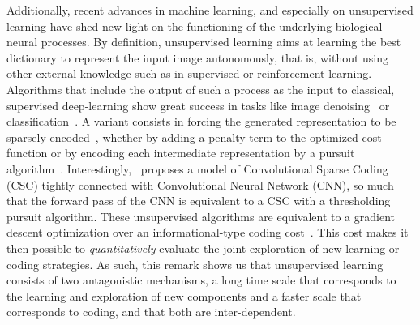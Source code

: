 \documentclass[vision,article,submit,oneauthor,pdftex]{Definitions/mdpi}
\begin{document}
Additionally, recent advances in machine learning, and especially on unsupervised learning have shed new light on the functioning of the underlying biological neural processes. By definition, unsupervised learning aims at learning the best dictionary to represent the input image autonomously, that is, without using other external knowledge such as in supervised or reinforcement learning. Algorithms that include the output of such a process as the input to classical, supervised deep-learning show great success in tasks like image denoising~\citep{Vincent08} or classification~\citep{Sulam2017multi}. A variant consists in forcing the generated representation to be sparsely encoded~\citep{MakhzaniF13}, whether by adding a penalty term to the optimized cost function or by encoding each intermediate representation by a pursuit algorithm~\citep{Papyan16}. Interestingly,~\citep{Papyan16} proposes a model of Convolutional Sparse Coding (CSC) tightly connected with Convolutional Neural Network (CNN), so much that the forward pass of the CNN is equivalent to a CSC with a thresholding pursuit algorithm. These unsupervised algorithms are equivalent to a gradient descent optimization over an informational-type coding cost~\citep{Kingma13}. This cost makes it then possible to \emph{quantitatively} evaluate the joint exploration of new learning or coding strategies. As such, this remark shows us that unsupervised learning consists of two antagonistic mechanisms, a long time scale that corresponds to the learning and exploration of new components and a faster scale that corresponds to coding, and that both are inter-dependent. 
\end{document}
